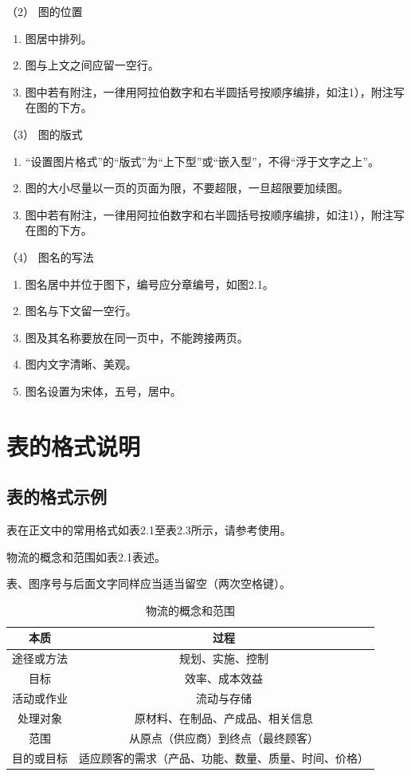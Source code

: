 （2） 图的位置
\begin{enumerate}[label=\circled{\arabic*}]
\item 图居中排列。
\item 图与上文之间应留一空行。
\item 图中若有附注，一律用阿拉伯数字和右半圆括号按顺序编排，如注1），附注写在图的下方。
\end{enumerate}

（3） 图的版式
\begin{enumerate}[label=\circled{\arabic*}]
\item “设置图片格式”的“版式”为“上下型”或“嵌入型”，不得“浮于文字之上”。
\item 图的大小尽量以一页的页面为限，不要超限，一旦超限要加续图。
\item 图中若有附注，一律用阿拉伯数字和右半圆括号按顺序编排，如注1），附注写在图的下方。
\end{enumerate}

（4） 图名的写法
\begin{enumerate}[label=\circled{\arabic*}]
\item 图名居中并位于图下，编号应分章编号，如图2.1。
\item 图名与下文留一空行。
\item 图及其名称要放在同一页中，不能跨接两页。
\item 图内文字清晰、美观。
\item 图名设置为宋体，五号，居中。
\end{enumerate}

\section{表的格式说明}
\subsection{表的格式示例}
表在正文中的常用格式如表2.1至表2.3所示，请参考使用。

物流的概念和范围如表2.1表述。

表、图序号与后面文字同样应当适当留空（两次空格键）。

\begin{table}
	\centering
	\song\wuhao 
	\caption{物流的概念和范围}
	\begin{tabular}{cc}
	\hline
	本质&过程\\
	\hline
	途径或方法&规划、实施、控制\\
	目标&效率、成本效益\\
	活动或作业&流动与存储\\
	处理对象&原材料、在制品、产成品、相关信息\\
	范围&从原点（供应商）到终点（最终顾客）\\
	目的或目标&适应顾客的需求（产品、功能、数量、质量、时间、价格）\\
	\hline
	\end{tabular}
\end{table}

